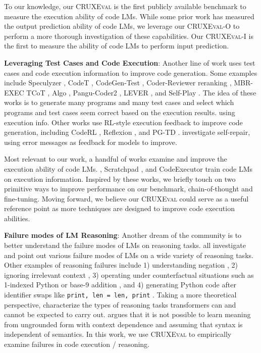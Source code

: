\documentclass{article}
\newcommand{\benchmark}{\textsc{CRUXEval}\xspace}
\newcommand{\benchmarki}{\textsc{CRUXEval-I}\xspace}
\newcommand{\benchmarko}{\textsc{CRUXEval-O}\xspace}
\begin{document}
To our knowledge, our \benchmark is the first publicly available benchmark to measure the execution ability of code LMs. While some prior work has measured the output prediction ability of code LMs, we leverage our \benchmarko to perform a more thorough investigation of these capabilities. Our \benchmarki is the first to measure the ability of code LMs to perform input prediction.

\textbf{Leveraging Test Cases and Code Execution}: Another line of work uses test cases and code execution information to improve code generation. Some examples include Speculyzer \citep{key2022speak}, CodeT \citep{chen2022codet}, CodeGen-Test \citep{zhong2022codegen}, Coder-Reviewer reranking \citep{zhang2023coder}, MBR-EXEC \citep{shi2022natural}
TCoT \citep{tian2023test},
Algo \citep{zhang2023algo}, Pangu-Coder2 \citep{shen2023pangu}, LEVER \cite{ni2023lever}, and Self-Play \citep{haluptzok2022language}.
The idea of these works is to generate many programs and many test cases and select which programs and test cases seem correct based on the execution results. 
using execution info. Other works use RL-style execution feedback to improve code generation, including CodeRL \citep{le2022coderl}, Reflexion \citep{shinn2023reflexion}, and PG-TD \citep{zhang2023planning}. \citep{chen2023teaching, olausson2023demystifying, madaan2023self, peng2023check, zhang2023self} investigate self-repair, using error messages as feedback for models to improve.

Most relevant to our work, a handful of works examine and improve the execution ability of code LMs. \cite{austin2021program}, 
Scratchpad \citep{nye2021show}, and CodeExecutor \citep{liu2023code} train code LMs on execution information. Inspired by these works, we briefly touch on two primitive ways to improve performance on our benchmark, chain-of-thought and fine-tuning. Moving forward, we believe our \benchmark could serve as a useful reference point as more techniques are designed to improve code execution abilities.

\textbf{Failure modes of LM Reasoning}: Another dream of the community is to better understand the failure modes of LMs on reasoning tasks. \cite{bubeck2023sparks, liu2023evaluating, arkoudas2023gpt, zhang2022paradox, dziri2023faith, olausson2023linc, lee2023teaching, zhang2023can} all investigate and point out various failure modes of LMs on a wide variety of reasoning tasks. Other examples of reasoning failures include 1) understanding negation \citep{hosseini2021understanding}, 2) ignoring irrelevant context \citep{shi2023large}, 3) operating under counterfactual situations such as 1-indexed Python or base-9 addition \citep{wu2023reasoning}, and 4) generating Python code after identifier swaps like \texttt{print, len = len, print} \citep{miceli2023larger}. Taking a more theoretical perspective, \cite{dziri2023faith, zhou2023algorithms, merrill2023expresssive, giannou2023looped} characterize the types of reasoning tasks transformers can and cannot be expected to carry out.
\cite{merrill2021provable} argues that it is not possible to learn meaning from ungrounded form with context dependence and assuming that syntax is independent of semantics. 
In this work, we use \benchmark to empirically examine failures in code execution / reasoning. 
\end{document}
